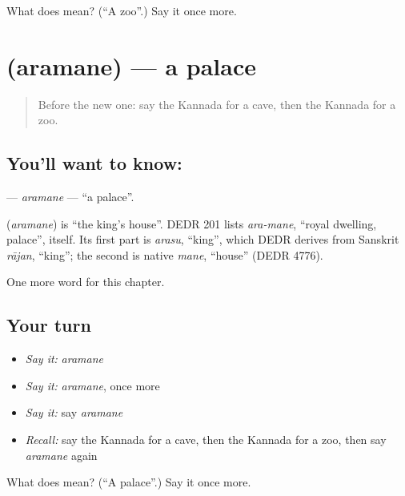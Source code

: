 \begin{tcolorbox}[breakable,colback=teal!4,colframe=teal!35!black,title={Before you move on}]
What does  mean? (\textquotedblleft{}A zoo\textquotedblright{}.) Say it once more.
\end{tcolorbox}
\section[\texorpdfstring{\kn{ಅರಮನೆ} (aramane)}{ಅರಮನೆ (aramane)}]{ (aramane) — a palace}

\label{lesson:KA-C174-aramane}



\begin{quote}
Before the new one: say the Kannada for a cave, then the Kannada for a zoo.
\end{quote}

\subsection*{You'll want to know: }
\textbf{} — \emph{aramane} — \textquotedblleft{}a palace\textquotedblright{}.

\begin{cousinweb}
\textbf{} (\emph{aramane}) is \textquotedblleft{}the king's house\textquotedblright{}. DEDR 201 lists \emph{ara-mane}, \textquotedblleft{}royal dwelling, palace\textquotedblright{}, itself. Its first part is \emph{arasu}, \textquotedblleft{}king\textquotedblright{}, which DEDR derives from Sanskrit \emph{rājan}, \textquotedblleft{}king\textquotedblright{}; the second is native \emph{mane}, \textquotedblleft{}house\textquotedblright{} (DEDR 4776).
\end{cousinweb}

\begin{grammarlens}[title={What you've built}]
One more word for this chapter.
\end{grammarlens}

\subsection*{Your turn}
\begin{itemize}
\raggedright
  \item \emph{Say it:} \emph{aramane}
  \item \emph{Say it:} \emph{aramane}, once more
  \item \emph{Say it:} say \emph{aramane}
  \item \emph{Recall:} say the Kannada for a cave, then the Kannada for a zoo, then say \emph{aramane} again
\end{itemize}

\begin{tcolorbox}[breakable,colback=teal!4,colframe=teal!35!black,title={Before you move on}]
What does  mean? (\textquotedblleft{}A palace\textquotedblright{}.) Say it once more.
\end{tcolorbox}
